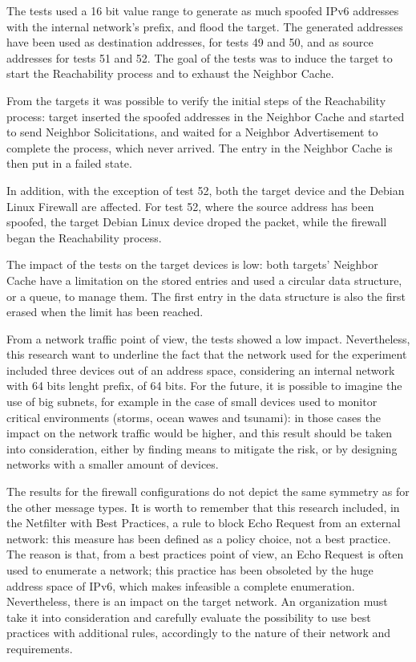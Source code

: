 \documentclass[12pt]{article}
\begin{document}
The tests used a 16 bit value range to generate as much spoofed IPv6 addresses with the internal network's prefix, and flood the target. The generated addresses have been used as destination addresses, for tests 49 and 50, and as source addresses for tests 51 and 52. The goal of the tests was to induce the target to start the Reachability process and to exhaust the Neighbor Cache.

From the targets it was possible to verify the initial steps of the Reachability process: target inserted the spoofed addresses in the Neighbor Cache and started to send Neighbor Solicitations, and waited for a Neighbor Advertisement to complete the process, which never arrived. The entry in the Neighbor Cache is then put in a failed state.

In addition, with the exception of test 52, both the target device and the Debian Linux Firewall are affected. For test 52, where the source address has been spoofed, the target Debian Linux device droped the packet, while the firewall began the Reachability process.

The impact of the tests on the target devices is low: both targets' Neighbor Cache have a limitation on the stored entries and used a circular data structure, or a queue, to manage them. The first entry in the data structure is also the first erased when the limit has been reached. 

From a network traffic point of view, the tests showed a low impact. Nevertheless, this research want to underline the fact that the network used for the experiment included three devices out of an address space, considering an internal network with 64 bits lenght prefix, of 64 bits. For the future, it is possible to imagine the use of big subnets, for example in the case of small devices used to monitor critical environments (storms, ocean wawes and tsunami): in those cases the impact on the network traffic would be higher, and this result should be taken into consideration, either by finding means to mitigate the risk, or by designing networks with a smaller amount of devices.

The results for the firewall configurations do not depict the same symmetry as for the other message types. It is worth to remember that this research included, in the Netfilter with Best Practices, a rule to block Echo Request from an external network: this measure has been defined as a policy choice, not a best practice. The reason is that, from a best practices point of view, an Echo Request is often used to enumerate a network; this practice has been obsoleted by the huge address space of IPv6, which makes infeasible a complete enumeration. Nevertheless, there is an impact on the target network. An organization must take it into consideration and carefully evaluate the possibility to use best practices with additional rules, accordingly to the nature of their network and requirements.
\end{document}

